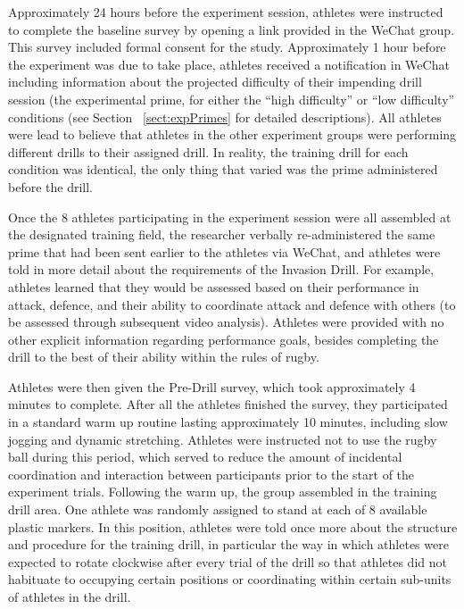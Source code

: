 \begin{CJK}{UTF8}{gbsn}
Approximately 24 hours before the experiment session, athletes were instructed to complete the baseline survey by opening a link provided in the WeChat group.  This survey included formal consent for the study.  Approximately 1 hour before the experiment was due to take place, athletes received a notification in WeChat including information about the projected difficulty of their impending drill session (the experimental prime, for either the ``high difficulty'' or ``low difficulty'' conditions (see Section ~\ref{sect:expPrimes} for detailed descriptions).   All athletes were lead to believe that athletes in the other experiment groups were performing different drills to their assigned drill.  In reality, the training drill for each condition was identical, the only thing that varied was the prime administered before the drill.

Once the 8 athletes participating in the experiment session were all assembled at the designated training field, the researcher verbally re-administered the same prime that had been sent earlier to the athletes via WeChat, and athletes were told in more detail about the requirements of the Invasion Drill.  For example, athletes learned that they would be assessed based on their performance in attack, defence, and their ability to coordinate attack and defence with others (to be assessed through subsequent video analysis).  Athletes were provided with no other explicit information regarding performance goals, besides completing the drill to the best of their ability within the rules of rugby.


Athletes were then given the Pre-Drill survey, which took approximately 4 minutes to complete.  After all the athletes finished the survey, they participated in a standard warm up routine lasting approximately 10 minutes, including slow jogging and dynamic stretching.  Athletes were instructed not to use the rugby ball during this period, which served to reduce the amount of incidental coordination and interaction between participants prior to the start of the experiment trials.  Following the warm up, the group assembled in the training drill area.  One athlete was randomly assigned to stand at each of 8 available plastic markers.  In this position, athletes were told once more about the structure and procedure for the training drill, in particular the way in which athletes were expected to rotate clockwise after every trial of the drill so that athletes did not habituate to occupying certain positions or coordinating within certain sub-units of athletes in the drill.


\end{CJK}

